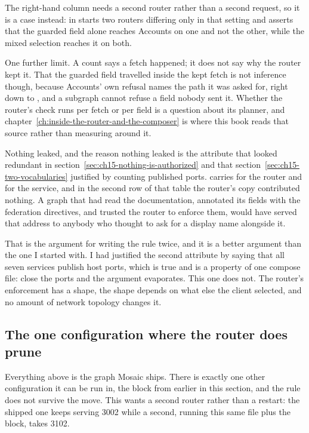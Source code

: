 The right-hand column needs a second router rather than a second request, so it
is a case instead:  in
 starts two routers differing only in that
setting and asserts that the guarded field alone reaches Accounts on one and not
the other, while the mixed selection reaches it on both.

%
One further limit. A count says a fetch happened; it does not say why the router
kept it. That the guarded field travelled inside the kept fetch is not inference
though, because Accounts' own refusal names the path it was asked for, right
down to , and a subgraph cannot refuse a field nobody sent
it. Whether the router's check runs per fetch or per field is a question about
its planner, and chapter~\ref{ch:inside-the-router-and-the-composer} is where
this book reads that source rather than measuring around it.

%
Nothing leaked, and the reason nothing leaked is the attribute that looked
redundant in section~\ref{sec:ch15-nothing-is-authorized} and that
section~\ref{sec:ch15-two-vocabularies} justified by counting published ports.
carries \code{[Authenticated]} for the router and \code{[Authorize]} for the
service, and in the second row of that table the router's copy contributed
nothing. A graph that had read the documentation, annotated its fields with the
federation directives, and trusted the router to enforce them, would have served
that address to anybody who thought to ask for a display name alongside it.

That is the argument for writing the rule twice, and it is a better argument
than the one I started with. I had justified the second attribute by saying that
all seven services publish host ports, which is true and is a property of one
compose file: close the ports and the argument evaporates. This one does not.
The router's enforcement has a shape, the shape depends on what else the client
selected, and no amount of network topology changes it.

\subsection*{The one configuration where the router does prune}

%
Everything above is the graph Mosaic ships. There is exactly one other
configuration it can be run in, the block from earlier in this section, and the
rule does not survive the move. This wants a second router rather than a
restart: the shipped one keeps serving 3002 while a second, running this same
file plus the block, takes 3102.

